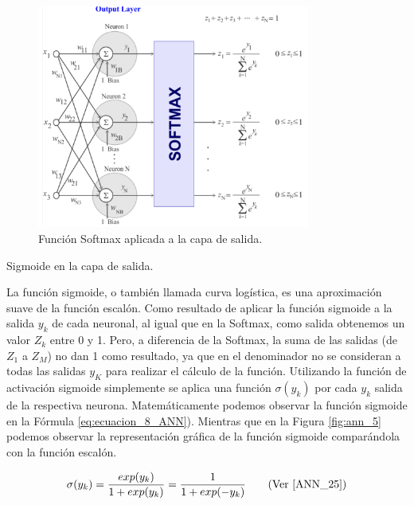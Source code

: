 \documentclass[12pt,a4paper]{article}
\makeatletter
\renewcommand\paragraph{\@startsection{paragraph}{4}{\z@}
            {-2.5ex\@plus -1ex \@minus -.25ex}
            {1.25ex \@plus .25ex}
            {\normalfont\normalsize\bfseries}}
\makeatother
\begin{document}
\begin{sloppypar}
\begin{figure}[H]    %
\centering
\includegraphics[width=0.8\textwidth]{images/ANN/4-ANN.png}
\caption[Función Softmax aplicada a la capa de salida.]{Función Softmax aplicada a la capa de salida\protect\footnotemark .}
 \label{fig:ann_4}
\end{figure}

\paragraph{Sigmoide en la capa de salida.} 

La función sigmoide, o también llamada curva logística, es una aproximación suave de la función escalón. Como resultado de aplicar la función sigmoide a la salida $y_k$ de cada neuronal, al igual que en la Softmax, como salida obtenemos un valor $Z_k$ entre 0 y 1. Pero, a diferencia de la Softmax, la suma de las salidas (de $Z_1$ a $Z_M$) no dan 1 como resultado, ya que en el denominador no se consideran a todas las salidas $y_K$ para realizar el cálculo de la función. Utilizando la función de activación sigmoide simplemente se aplica una función $\sigma(y_k)$ por cada $y_k$ salida de la respectiva neurona. Matemáticamente podemos observar la función sigmoide en la Fórmula \ref{eq:ecuacion_8_ANN}). 
Mientras que en la Figura \ref{fig:ann_5} podemos observar la representación gráfica de la función sigmoide comparándola con la función escalón. 

\begin{equation}\label{eq:ecuacion_8_ANN}
\sigma(y_k)= \frac{exp(y_k)}{ {1 + exp(y_k)}} =  \frac{1}{ {1+exp(-y_k)}}    \qquad \text{(Ver \cite{ANN_25})}
\end{equation}


\end{sloppypar}
\end{document}

